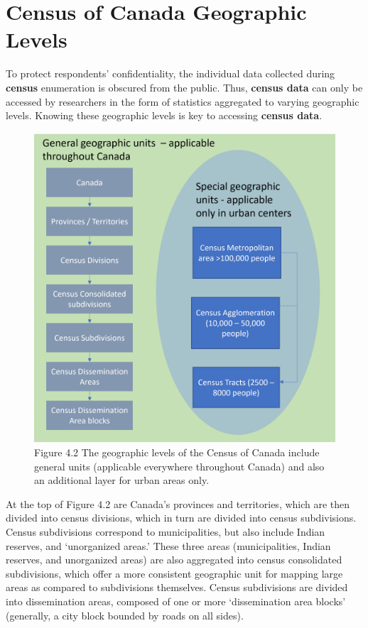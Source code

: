 \documentclass[
]{book}
\begin{document}
\hypertarget{census-of-canada-geographic-levels}{%
\section{Census of Canada Geographic Levels}\label{census-of-canada-geographic-levels}}

To protect respondents' confidentiality, the individual data collected during \textbf{census} enumeration is obscured from the public. Thus, \textbf{census data} can only be accessed by researchers in the form of statistics aggregated to varying geographic levels. Knowing these geographic levels is key to accessing \textbf{census data}.

\begin{figure}
\centering
\includegraphics{images/04-census-geographies.png}
\caption{Figure 4.2 The geographic levels of the Census of Canada include general units (applicable everywhere throughout Canada) and also an additional layer for urban areas only.}
\end{figure}

At the top of Figure 4.2 are Canada's provinces and territories, which are then divided into census divisions, which in turn are divided into census subdivisions. Census subdivisions correspond to municipalities, but also include Indian reserves, and `unorganized areas.' These three areas (municipalities, Indian reserves, and unorganized areas) are also aggregated into census consolidated subdivisions, which offer a more consistent geographic unit for mapping large areas as compared to subdivisions themselves. Census subdivisions are divided into dissemination areas, composed of one or more `dissemination area blocks' (generally, a city block bounded by roads on all sides).
\end{document}
